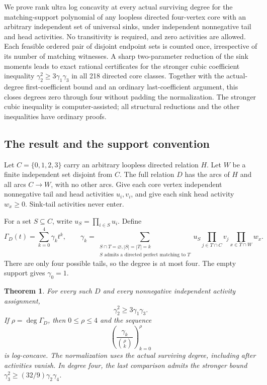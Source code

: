 \documentclass[11pt]{article}
\numberwithin{equation}{section}
\newtheorem{theorem}{Theorem}[section]\newtheorem{lemma}[theorem]{Lemma}\newtheorem{proposition}[theorem]{Proposition}\newtheorem{corollary}[theorem]{Corollary}
\theoremstyle{definition}\newtheorem{definition}[theorem]{Definition}\newtheorem{remark}[theorem]{Remark}
\newcommand{\Ga}{\Gamma}                   %
\begin{document}
We prove rank ultra log concavity at every actual surviving degree for the matching-support polynomial of any loopless directed four-vertex core with an arbitrary independent set of universal sinks, under independent nonnegative tail and head activities. No transitivity is required, and zero activities are allowed. Each feasible ordered pair of disjoint endpoint sets is counted once, irrespective of its number of matching witnesses. A sharp two-parameter reduction of the sink moments leads to exact rational certificates for the stronger cubic coefficient inequality $\gamma_2^2\ge3\gamma_1\gamma_3$ in all 218 directed core classes. Together with the actual-degree first-coefficient bound and an ordinary last-coefficient argument, this closes degrees zero through four without padding the normalization. The stronger cubic inequality is computer-assisted; all structural reductions and the other inequalities have ordinary proofs.

\subsection{The result and the support convention}
Let $C=\{0,1,2,3\}$ carry an arbitrary loopless directed relation $H$. Let $W$ be a finite independent set disjoint from $C$. The full relation $D$ has the arcs of $H$ and all arcs $C\to W$, with no other arcs. Give each core vertex independent nonnegative tail and head activities $u_i,v_i$, and give each sink head activity $w_x\ge0$. Sink-tail activities never enter.

For a set $S\subseteq C$, write $u_S=\prod_{i\in S}u_i$. Define
\[
 \Ga_D(t)=\sum_{k=0}^4\gamma_k t^k,\qquad
 \gamma_k=\sum_{\substack{S\cap T=\varnothing, |S|=|T|=k\\
                         S\text{ admits a directed perfect matching to }T}}
 u_S\prod_{j\in T\cap C}v_j\prod_{x\in T\cap W}w_x.
\]
There are only four possible tails, so the degree is at most four. The empty support gives $\gamma_0=1$.

\begin{theorem}\label{pgr:s:ad:thm:main}
For every such $D$ and every nonnegative independent activity assignment,
\begin{equation}\label{pgr:s:ad:eq:middle}
 \gamma_2^2\ge3\gamma_1\gamma_3.
\end{equation}
If $\rho=\deg\Ga_D$, then $0\le\rho\le4$ and the sequence
\[
 \left(\frac{\gamma_k}{\binom{\rho}k}\right)_{k=0}^{\rho}
\]
is log-concave. The normalization uses the actual surviving degree, including after activities vanish. In degree four, the last comparison admits the stronger bound $\gamma_3^2\ge(32/9)\gamma_2\gamma_4$.
\end{theorem}
\end{document}
